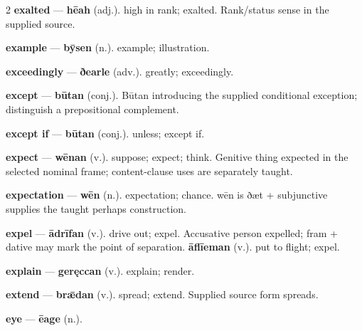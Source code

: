\begin{multicols}{2}
\textbf{exalted} — \textbf{hēah} (adj.). high in rank; exalted. Rank/status sense in the supplied source.\par
\textbf{example} — \textbf{bȳsen} (n.). example; illustration.\par
\textbf{exceedingly} — \textbf{ðearle} (adv.). greatly; exceedingly.\par
\textbf{except} — \textbf{būtan} (conj.). Būtan introducing the supplied conditional exception; distinguish a prepositional complement.\par
\textbf{except if} — \textbf{būtan} (conj.). unless; except if.\par
\textbf{expect} — \textbf{wēnan} (v.). suppose; expect; think. Genitive thing expected in the selected nominal frame; content-clause uses are separately taught.\par
\textbf{expectation} — \textbf{wēn} (n.). expectation; chance. wēn is ðæt + subjunctive supplies the taught perhaps construction.\par
\textbf{expel} — \textbf{ādrīfan} (v.). drive out; expel. Accusative person expelled; fram + dative may mark the point of separation. \textbf{āflīeman} (v.). put to flight; expel.\par
\textbf{explain} — \textbf{geręccan} (v.). explain; render.\par
\textbf{extend} — \textbf{brǣdan} (v.). spread; extend. Supplied source form spreads.\par
\textbf{eye} — \textbf{ēage} (n.).\par

\end{multicols}
